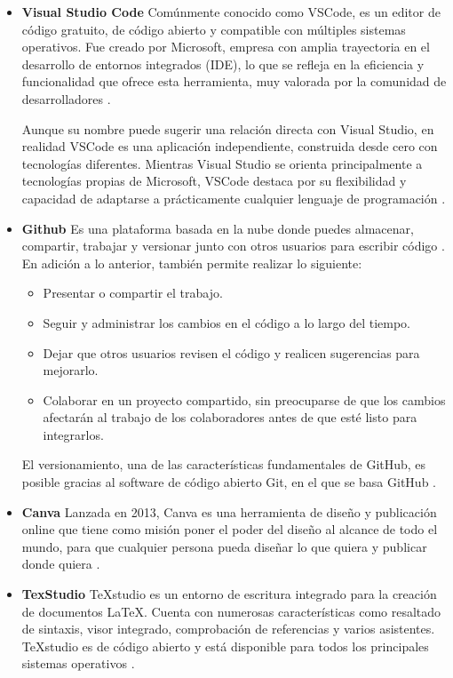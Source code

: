 \begin{itemize}	
	\item\textbf{Visual Studio Code} Comúnmente conocido como VSCode, es un editor de código gratuito, de código abierto y compatible con múltiples sistemas operativos. Fue creado por Microsoft, empresa con amplia trayectoria en el desarrollo de entornos integrados (IDE), lo que se refleja en la eficiencia y funcionalidad que ofrece esta herramienta, muy valorada por la comunidad de desarrolladores \cite{cimas2024vscode}.
	
	Aunque su nombre puede sugerir una relación directa con Visual Studio, en realidad VSCode es una aplicación independiente, construida desde cero con tecnologías diferentes. Mientras Visual Studio se orienta principalmente a tecnologías propias de Microsoft, VSCode destaca por su flexibilidad y capacidad de adaptarse a prácticamente cualquier lenguaje de programación \cite{garcia2024vscode}.
	
	\item\textbf{Github} Es una plataforma basada en la nube donde puedes almacenar, compartir, trabajar y versionar junto con otros usuarios para escribir código \cite{github2025about}. En adición a lo anterior, también permite realizar lo siguiente:
	
	\begin{itemize}
		\item Presentar o compartir el trabajo.
		\item Seguir y administrar los cambios en el código a lo largo del tiempo.
		\item Dejar que otros usuarios revisen el código y realicen sugerencias para mejorarlo.
		\item Colaborar en un proyecto compartido, sin preocuparse de que los cambios afectarán al trabajo de los colaboradores antes de que esté listo para integrarlos.
	\end{itemize}
	
	El versionamiento, una de las características fundamentales de GitHub, es posible gracias al software de código abierto Git, en el que se basa GitHub \cite{github2025about}.
	
	\item\textbf{Canva}	Lanzada en 2013, Canva es una herramienta de diseño y publicación online que tiene como misión poner el poder del diseño al alcance de todo el mundo, para que cualquier persona pueda diseñar lo que quiera y publicar donde quiera \cite{canva2025about}.
		
	\item\textbf{TexStudio}	TeXstudio es un entorno de escritura integrado para la creación de documentos LaTeX. Cuenta con numerosas características como resaltado de sintaxis, visor integrado, comprobación de referencias y varios asistentes. TeXstudio es de código abierto y está disponible para todos los principales sistemas operativos \cite{texstudio}.
	
	
\end{itemize}
